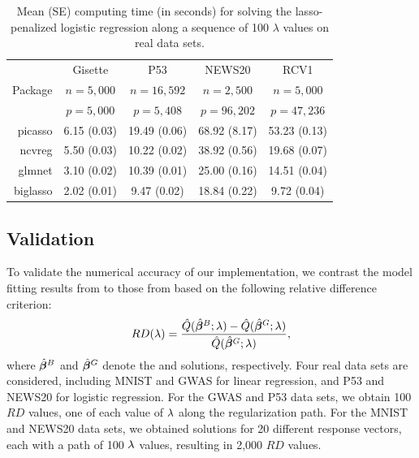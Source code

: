 \begin{table}[htbp]
\centering
\begin{tabular}{r|cccc}
\toprule
 & Gisette & P53 & NEWS20 & RCV1 \\
Package & $n = 5,000$ & $n=16,592$ & $n=2,500$ & $n=5,000$ \\
 & $p = 5,000$ & $p=5,408$ & $p=96,202$ & $p=47,236$ \\
\midrule
picasso & 6.15 (0.03) & 19.49 (0.06) & 68.92 (8.17) & 53.23 (0.13)\\
ncvreg & 5.50 (0.03) & 10.22 (0.02) & 38.92 (0.56) & 19.68 (0.07) \\
glmnet & 3.10 (0.02) & 10.39 (0.01) &  25.00 (0.16) & 14.51 (0.04) \\
biglasso & 2.02 (0.01) & 9.47 (0.02) &  18.84 (0.22) & 9.72 (0.04) \\
\bottomrule
\end{tabular}
\caption{Mean (SE) computing time (in seconds) for solving the lasso-penalized logistic regression along a sequence of 100 $\lambda$ values on real data sets.}
\label{tab_real_res_log}
\end{table}


\subsection{Validation}

To validate the numerical accuracy of our implementation, we contrast the model fitting results from  to those from  based on the following relative difference criterion:
\begin{equation} \label{criterion}
RD(\lambda) = \frac{\hat{Q}(\hat{\boldsymbol{\beta}}^B; \lambda) - \hat{Q}(\hat{\boldsymbol{\beta}}^G; \lambda)}{\hat{Q}(\hat{\boldsymbol{\beta}}^G; \lambda)},
\end{equation}
where $\hat{\boldsymbol{\beta}}^B$ and $\hat{\boldsymbol{\beta}}^G$ denote the  and  solutions, respectively.  Four real data sets are considered, including MNIST and GWAS for linear regression, and P53 and NEWS20 for logistic regression. For the GWAS and P53 data sets, we obtain 100 $RD$ values, one of each value of $\lambda$ along the regularization path.  For the MNIST and NEWS20 data sets, we obtained solutions for 20 different response vectors, each with a path of 100 $\lambda$ values, resulting in 2,000 $RD$ values.


